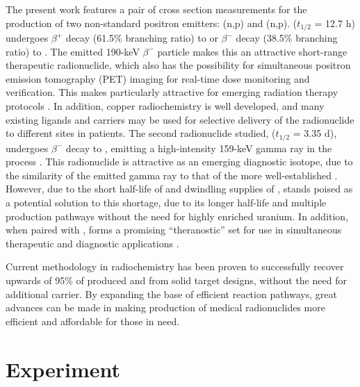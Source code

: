 \documentclass[5p]{elsarticle}
\newcommand{\comment}[1]{\todo[color=blue!20!white,inline]{ASV: #1}}
\begin{document}
The present work features a pair of cross section measurements for the production of two non-standard positron emitters: (n,p) and (n,p).   ($t_{1/2}$ = 12.7 h) undergoes $\beta^+$ decay (61.5\% branching ratio) to  or $\beta^-$ decay (38.5\% branching ratio) to  \cite{Singh2007}. The emitted 190-keV $\beta^-$ particle makes this an  attractive short-range therapeutic radionuclide, which also has the possibility for simultaneous positron emission tomography (PET) imaging for real-time dose monitoring and verification. This makes  particularly attractive for emerging radiation therapy protocols \cite{Lewis2003,NSACIsotopesSubcommittee2015,Bandari2014,mp500671j}. In addition, copper radiochemistry is well developed, and many existing ligands and carriers may be used for selective delivery of the radionuclide to different sites in patients. The second radionuclide studied,  ($t_{1/2}$ = 3.35 d), undergoes $\beta^-$ decay to , emitting a high-intensity 159-keV gamma ray in the process \cite{Burrows2007}. This radionuclide is  attractive as an emerging diagnostic isotope, due to the similarity of the emitted gamma ray to that of the more well-established  \cite{Qaim2011,Qaim201731,Kolsky1998,mausner1995evaluation}. However, due to the short half-life of and dwindling supplies of ,  stands poised as a potential solution to this shortage, due to its longer half-life and multiple production pathways without the need for highly enriched uranium. In addition, when paired with ,  forms a promising \enquote{theranostic} set for use in simultaneous therapeutic and diagnostic applications \cite{Muller2014,Deilami-nezhad2016}.




Current methodology in radiochemistry has been proven to successfully recover upwards of 95\% of produced \cite{bhatki1969preparation,mirzadeh1992spontaneous} and \cite{Aly1971,Bokhari2010,BF02047448} from solid target designs, without the need for additional carrier. By expanding the base of efficient reaction pathways, great advances can be made in making production of medical radionuclides more efficient and affordable for those in need.





\section{Experiment}\label{sec:experiment}
\end{document}
